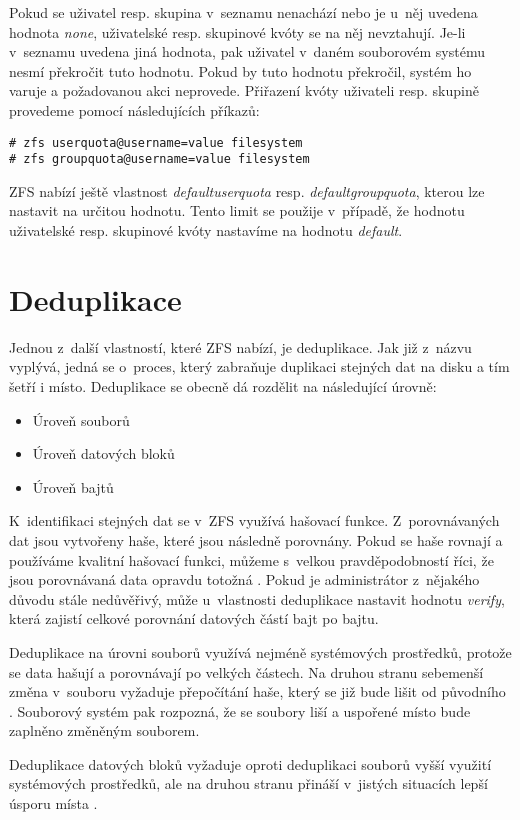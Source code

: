Pokud se uživatel resp. skupina v~seznamu nenachází nebo je u~něj uvedena hodnota \emph{none}, uživatelské resp. skupinové kvóty se na něj nevztahují. Je-li v~seznamu uvedena jiná hodnota, pak uživatel v~daném souborovém systému nesmí překročit tuto hodnotu. Pokud by tuto hodnotu překročil, systém ho varuje a požadovanou akci neprovede. Přiřazení kvóty uživateli resp. skupině provedeme pomocí následujících příkazů:
\begin{verbatim}
# zfs userquota@username=value filesystem
# zfs groupquota@username=value filesystem
\end{verbatim}

ZFS nabízí ještě vlastnost \emph{defaultuserquota} resp. \emph{defaultgroupquota}, kterou lze nastavit na určitou hodnotu. Tento limit se použije v~případě, že hodnotu uživatelské resp. skupinové kvóty nastavíme na hodnotu \emph{default}.
\section{Deduplikace}
\label{dedup}
Jednou z~další vlastností, které ZFS nabízí, je deduplikace. Jak již z~názvu vyplývá, jedná se o~proces, který zabraňuje duplikaci stejných dat na disku a tím šetří i místo. Deduplikace se obecně dá rozdělit na následující úrovně:
\begin{itemize}
  \item Úroveň souborů
  \item Úroveň datových bloků
  \item Úroveň bajtů
\end{itemize}

K~identifikaci stejných dat se v~ZFS využívá hašovací funkce. Z~porovnávaných dat jsou vytvořeny haše, které jsou následně porovnány. Pokud se haše rovnají a používáme kvalitní hašovací funkci, můžeme s~velkou pravděpodobností říci, že jsou porovnávaná data opravdu totožná \cite{dedup}. Pokud je administrátor z~nějakého důvodu stále nedůvěřivý, může u~vlastnosti deduplikace nastavit hodnotu \emph{verify}, která zajistí celkové porovnání datových částí bajt po bajtu.

Deduplikace na úrovni souborů využívá nejméně systémových prostředků, protože se data hašují a porovnávají po velkých částech. Na druhou stranu sebemenší změna v~souboru vyžaduje přepočítání haše, který se již bude lišit od původního \cite{dedup}. Souborový systém pak rozpozná, že se soubory liší a uspořené místo bude zaplněno změněným souborem.

Deduplikace datových bloků vyžaduje oproti deduplikaci souborů vyšší využití systémových prostředků, ale na druhou stranu přináší v~jistých situacích lepší úsporu místa \cite{dedup}.

